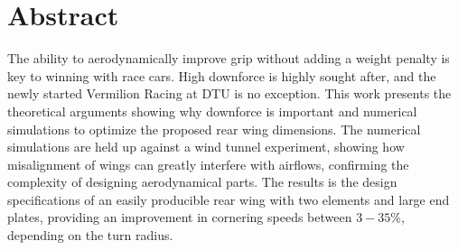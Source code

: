 \vspace{6cm}
\chapter*{Abstract}

The ability to aerodynamically improve grip without adding a weight penalty is key to winning with race cars. High downforce is highly sought after, and the newly started Vermilion Racing at DTU is no exception. This work presents the theoretical arguments showing why downforce is important and numerical simulations to optimize the proposed rear wing dimensions. The numerical simulations are held up against a wind tunnel experiment, showing how misalignment of wings can greatly interfere with airflows, confirming the complexity of designing aerodynamical parts. The results is the design specifications of an easily producible rear wing with two elements and large end plates, providing an improvement in cornering speeds between $3-35\%$, depending on the turn radius. 


